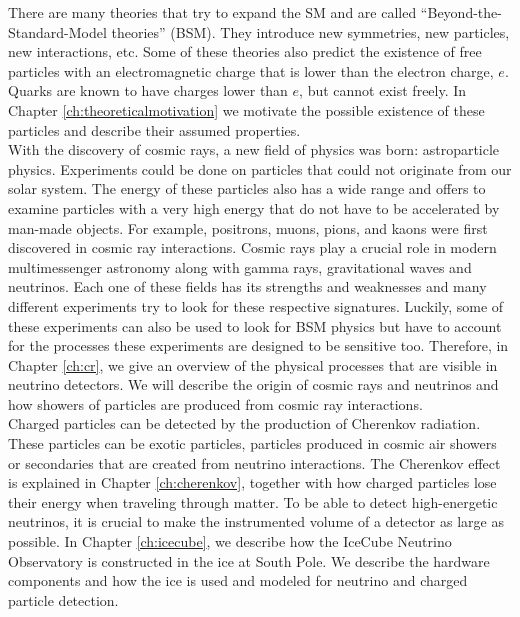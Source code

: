 \noindent There are many theories that try to expand the SM and are called ``Beyond-the-Standard-Model theories'' (BSM). They introduce new symmetries, new particles, new interactions, etc. Some of these theories also predict the existence of free particles with an electromagnetic charge that is lower than the electron charge, $e$. Quarks are known to have charges lower than $e$, but cannot exist freely. In Chapter \ref{ch:theoreticalmotivation} we motivate the possible existence of these particles and describe their assumed properties.\\

\noindent With the discovery of cosmic rays, a new field of physics was born: astroparticle physics. Experiments could be done on particles that could not originate from our solar system. The energy of these particles also has a wide range and offers to examine particles with a very high energy that do not have to be accelerated by man-made objects. For example, positrons, muons, pions, and kaons were first discovered in cosmic ray interactions. Cosmic rays play a crucial role in modern multimessenger astronomy along with gamma rays, gravitational waves and neutrinos. Each one of these fields has its strengths and weaknesses and many different experiments try to look for these respective signatures. Luckily, some of these experiments can also be used to look for BSM physics but have to account for the processes these experiments are designed to be sensitive too. Therefore, in Chapter \ref{ch:cr}, we give an overview of the physical processes that are visible in neutrino detectors. We will describe the origin of cosmic rays and neutrinos and how showers of particles are produced from cosmic ray interactions.\\

\noindent Charged particles can be detected by the production of Cherenkov radiation. These particles can be exotic particles, particles produced in cosmic air showers or secondaries that are created from neutrino interactions. The Cherenkov effect is explained in Chapter \ref{ch:cherenkov}, together with how charged particles lose their energy when traveling through matter.
To be able to detect high-energetic neutrinos, it is crucial to make the instrumented volume of a detector as large as possible. In Chapter \ref{ch:icecube}, we describe how the IceCube Neutrino Observatory is constructed in the ice at South Pole. We describe the hardware components and how the ice is used and modeled for neutrino and charged particle detection.

